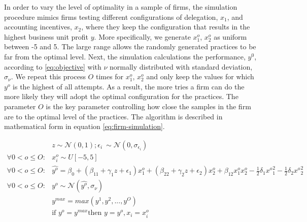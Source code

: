 \documentclass[12pt]{article}
\begin{document}
In order to vary the level of optimality in a sample of firms, the simulation procedure mimics firms testing different configurations of delegation, $x_1$,  and accounting incentives, $x_2$, where they keep the configuration that results in the highest business unit profit $y$. More specifically, we generate \(x^o_{1}\), \(x^o_{2}\) as uniform between -5 and 5. The large range allows the randomly generated practices to be far from the optimal level.  Next, the simulation calculations the performance, $y^0$, according to \eqref{eq:objective} with $\nu$ normally distributed with standard deviation, $\sigma_{\nu}$. We repeat this process $O$ times for \(x^o_{1}\), \(x^o_{2}\) and only keep the values for which $y^o$ is the highest of all attempts. As a result, the more tries a firm can do the more likely they will adopt the optimal configuration for the practices. The parameter $O$ is the key parameter controlling how close the samples in the firm are to the optimal level of the practices. The algorithm is described in mathematical form in equation \eqref{eq:firm-simulation}. 

\begin{equation}\label{eq:firm-simulation}
\begin{aligned}
	&z \sim \mathcal{N}(0, 1); \epsilon_i ~ \sim \mathcal{N}(0, \sigma_{\epsilon_i}) \\
    \forall 0 < o \leq O: &x^o_i \sim U[-5,5] \\
    \forall 0 < o \leq O: &\hat{y^o} = \beta_0 + (\beta_{11} + \gamma_1 z + \epsilon_1) x^o_1 
						+ (\beta_{22} + \gamma_2 z  + \epsilon_2) x^o_2 
                        + \beta_{12} x^o_1 x^o_2 - \frac{1}{2}\delta_1 {x^o}^2_1 - \frac{1}{2}\delta_2 {x^o}^2_2 \\
     \forall 0 < o \leq O: &y^o \sim \mathcal{N}(\hat{y^o}, \sigma_{\nu}) \\
	 &y^{max} = max(y^1, y^2, ..., y^O)  \\
     &\text{if } y^o = y^{max} \text{then } y = y^o, x_i = x^o_i
\end{aligned}
\end{equation}
\end{document}
